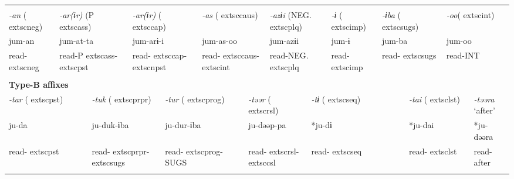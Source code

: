 \tabletail{}
\tablelasttail{}
\begin{tabularx}{\textwidth}{XXXXXXXXXXXXXXXXXXXXXXX}
\lsptoprule
\multicolumn{23}{X}{{\bfseries Type-A affixes}}\\
{ \textit{{}-an} (	extsc{neg})} & \multicolumn{4}{X}{{ \textit{{}-ar(ɨr)} (P	extsc{ass})}} & \multicolumn{5}{X}{{ \textit{{}-ar(ɨr)} (	extsc{cap})}} & \multicolumn{4}{X}{{ \textit{{}-as} (	extsc{caus})}} & \multicolumn{3}{X}{{ \textit{{}-azɨi} (NEG.	extsc{plq})}} & { \textit{{}-ɨ} (	extsc{imp})} & \multicolumn{2}{X}{{ \textit{{}-ɨba} (	extsc{sugs})}} & \multicolumn{2}{X}{{ \textit{{}-oo}(	extsc{int})}} & \\
{ jum-an} & \multicolumn{4}{X}{{ jum-at-ta}} & \multicolumn{5}{X}{{ jum-arɨ-i}} & \multicolumn{4}{X}{{ jum-as-oo}} & \multicolumn{3}{X}{{ jum-azɨi}} & { jum-ɨ} & \multicolumn{2}{X}{{ jum-ba}} & \multicolumn{2}{X}{{ jum-oo}} & \\
read-	extsc{neg} & \multicolumn{4}{X}{read-P	extsc{ass}-	extsc{pst}} & \multicolumn{5}{X}{read-	extsc{cap}-	extsc{npst}} & \multicolumn{4}{X}{read-	extsc{caus}-	extsc{int}} & \multicolumn{3}{X}{read-NEG.	extsc{plq}} & read-	extsc{imp} & \multicolumn{2}{X}{read-	extsc{sugs}} & \multicolumn{2}{X}{read-INT} & \\
\multicolumn{23}{X}{}\\
\multicolumn{23}{X}{{\bfseries Type-B affixes}}\\
\multicolumn{3}{X}{{ \textit{{}-tar} (	extsc{pst})}} & \multicolumn{5}{X}{{ \textit{{}-tuk} (	extsc{prpr})}} & \multicolumn{4}{X}{{ \textit{{}-tur} (	extsc{prog})}} & \multicolumn{4}{X}{{ \textit{{}-təər} (	extsc{rsl})}} & \multicolumn{3}{X}{{ \textit{{}-tɨ} (	extsc{seq})}} & \multicolumn{2}{X}{{ \textit{{}-tai} (	extsc{lst})}} & \multicolumn{2}{X}{{ \textit{{}-təəra} ‘after’}}\\
\multicolumn{3}{X}{{ ju-da}} & \multicolumn{5}{X}{{ ju-duk-ɨba}} & \multicolumn{4}{X}{{ ju-dur-ɨba}} & \multicolumn{4}{X}{{ ju-dəəp-pa}} & \multicolumn{3}{X}{{ *ju-dɨ}} & \multicolumn{2}{X}{{ *ju-dai}} & \multicolumn{2}{X}{{ *ju-dəəra}}\\
\multicolumn{3}{X}{read-	extsc{pst}} & \multicolumn{5}{X}{read-	extsc{prpr}-	extsc{sugs}} & \multicolumn{4}{X}{read-	extsc{prog}-SUGS} & \multicolumn{4}{X}{read-	extsc{rsl}-	extsc{csl}} & \multicolumn{3}{X}{read-	extsc{seq}} & \multicolumn{2}{X}{read-	extsc{lst}} & \multicolumn{2}{X}{{ read-after}}\\
\multicolumn{3}{X}{} & \multicolumn{5}{X}{} & \multicolumn{4}{X}{} & \multicolumn{4}{X}{} & \multicolumn{3}{X}{} & \multicolumn{2}{X}{} & \multicolumn{2}{X}{}\\

\end{tabularx}

